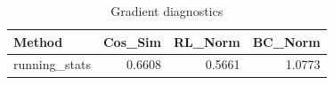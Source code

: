 \begin{table}[htbp]
\centering
\caption{Gradient diagnostics}
\label{tab:grad-diag}
\begin{tabular}{lrrr}
\toprule
\textbf{Method} & \textbf{Cos\_Sim} & \textbf{RL\_Norm} & \textbf{BC\_Norm} \\
\midrule
running\_stats & 0.6608 & 0.5661 & 1.0773 \\
\bottomrule
\end{tabular}
\end{table}